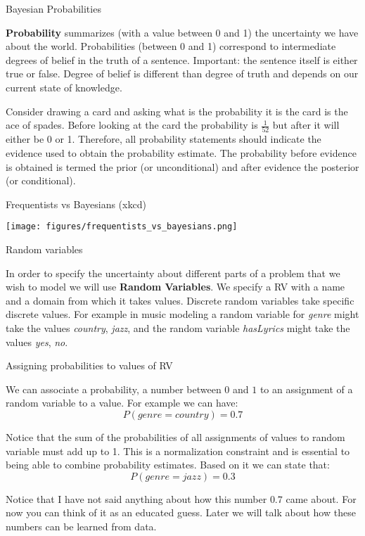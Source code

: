 \documentclass[12pt]{beamer}
\begin{document}
\begin{frame}{Bayesian Probabilities} 

{\bf Probability} summarizes (with a value between 0 and 1) the
uncertainty we have about the world. Probabilities (between 0 and 1)
correspond to intermediate degrees of belief in the truth of a
sentence. Important: the sentence itself is either true or
false. Degree of belief is different than degree of truth and depends 
on our current state of knowledge. 

Consider drawing a card and asking what is the probability it is the
card is the ace of spades. Before looking at the card the probability
is $\frac{1}{52}$ but after it will either be 0 or 1. Therefore, all
probability statements should indicate the evidence used to obtain the
probability estimate. The probability before evidence is obtained is
termed the prior (or unconditional) and after evidence the posterior
(or conditional). 
\end{frame}



\begin{frame}{Frequentists vs Bayesians (xkcd)}
\begin{center} 
 \texttt{[image: figures/frequentists\_vs\_bayesians.png]}
\end{center} 
\end{frame} 


\begin{frame}{Random variables}

In order to specify the uncertainty about different parts of a problem
that we wish to model we will use {\bf Random Variables}. We specify a
RV with a name and a domain from which it takes values. Discrete
random variables take specific discrete values. For example in music
modeling a random variable for {\it genre} might take the values {\it
  country}, {\it jazz}, and the random variable {\it hasLyrics} might
take the values {\it yes}, {\it no}.
\end{frame} 

\begin{frame}{Assigning probabilities to values of RV} 

  We can associate a probability, a number between $0$ and $1$ to an assignment of a random variable to a value. For example we can have:
  \[
  P(genre = country) = 0.7 
  \]
  
Notice that the sum of the probabilities of all assignments of values
to random variable must add up to 1. This is a normalization
constraint and is essential to being able to combine probability
estimates. Based on it we can state that:
\[
P(genre = jazz) = 0.3 
\]

Notice that I have not said anything about how this number $0.7$ came
about. For now you can think of it as an educated guess. Later we will
talk about how these numbers can be learned from data.
  
\end{frame}
\end{document}
